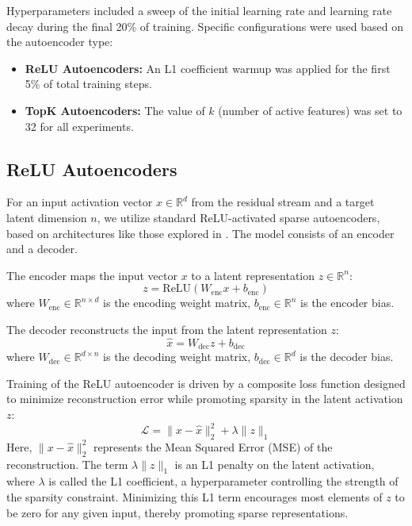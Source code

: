\documentclass{article}
\begin{document}
Hyperparameters included a sweep of the initial learning rate and learning rate decay during the final 20\% of training. Specific configurations were used based on the autoencoder type:
\begin{itemize}
    \item \textbf{ReLU Autoencoders:} An L1 coefficient warmup was applied for the first 5\% of total training steps.
    \item \textbf{TopK Autoencoders:} The value of $k$ (number of active features) was set to 32 for all experiments.
\end{itemize}


\subsection{ReLU Autoencoders}

For an input activation vector $x \in \mathbb{R}^d$ from the residual stream and a target latent dimension $n$, we utilize standard ReLU-activated sparse autoencoders, based on architectures like those explored in \cite{Cunningham et al., 2023}. The model consists of an encoder and a decoder.

The encoder maps the input vector $x$ to a latent representation $z \in \mathbb{R}^n$:
\[ z = \text{ReLU}(W_{\text{enc}}x + b_{\text{enc}}) \]
where $W_{\text{enc}} \in \mathbb{R}^{n \times d}$ is the encoding weight matrix, $b_{\text{enc}} \in \mathbb{R}^n$ is the encoder bias.

The decoder reconstructs the input from the latent representation $z$:
\[ \hat{x} = W_{\text{dec}}z + b_{\text{dec}} \]
where $W_{\text{dec}} \in \mathbb{R}^{d \times n}$ is the decoding weight matrix, $b_{\text{dec}} \in \mathbb{R}^d$ is the decoder bias.

Training of the ReLU autoencoder is driven by a composite loss function designed to minimize reconstruction error while promoting sparsity in the latent activation $z$:
\[ \mathcal{L} = \|x - \hat{x}\|^2_2 + \lambda \|z\|_1 \]
Here, $\|x - \hat{x}\|^2_2$ represents the Mean Squared Error (MSE) of the reconstruction. The term $\lambda \|z\|_1$ is an L1 penalty on the latent activation, where $\lambda$ is called the L1 coefficient, a hyperparameter controlling the strength of the sparsity constraint. Minimizing this L1 term encourages most elements of $z$ to be zero for any given input, thereby promoting sparse representations.
\end{document}
